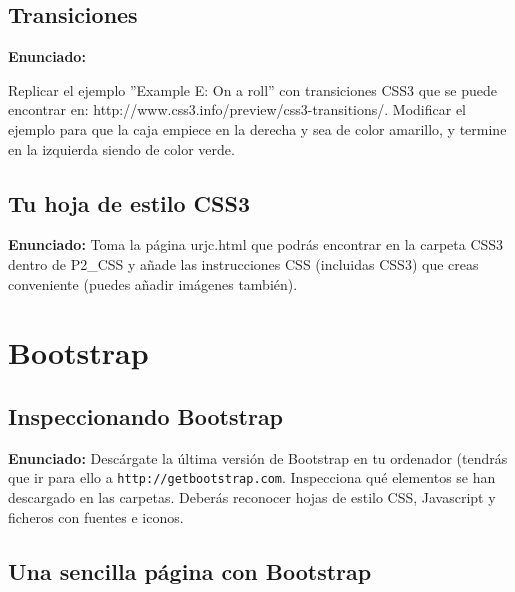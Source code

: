 \subsection{Transiciones}
\label{subsec:transiciones}

\textbf{Enunciado:}

Replicar el ejemplo ''Example E: On a roll'' con transiciones CSS3 que se puede encontrar en: http://www.css3.info/preview/css3-transitions/. Modificar el ejemplo para que la caja empiece en la derecha y sea de color amarillo, y termine en la izquierda siendo de color verde.


\subsection{Tu hoja de estilo CSS3}
\label{subsec:concurso}

\textbf{Enunciado:} Toma la página urjc.html que podrás encontrar en la carpeta CSS3 dentro de P2\_CSS y añade las instrucciones CSS (incluidas CSS3) que creas conveniente (puedes añadir imágenes también).

\section{Bootstrap}

\subsection{Inspeccionando Bootstrap}
\label{subsec:inspeccionando_bootstrap}

\textbf{Enunciado:} Descárgate la última versión de Bootstrap en tu ordenador
(tendrás que ir para ello a \verb|http://getbootstrap.com|.
Inspecciona qué elementos se han descargado en las carpetas. Deberás reconocer
hojas de estilo CSS, Javascript y ficheros con fuentes e iconos.

\subsection{Una sencilla página con Bootstrap}
\label{subsec:bootstrap_sencillo}

